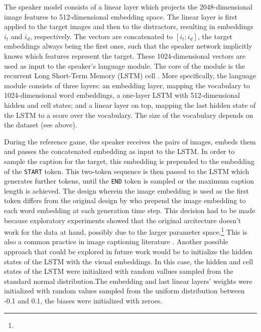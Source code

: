The speaker model consists of a linear layer which projects the 2048-dimensional image features to 512-dimensional embedding space.  The linear layer is first applied to the target images and then to the distractors, resulting in embeddings $i_t$ and $i_d$, respectively. The vectors are concatenated to $[i_t; i_d]$, the target embeddings always being the first ones, such that the speaker network implicitly knows which features represent the target. These 1024-dimensional vectors are used as input to the speaker's language module. The core of the module is the recurrent Long Short-Term Memory (LSTM) cell \parencite{hochreiter1997long}. More specifically, the language module consists of three layers: an embedding layer, mapping the vocabulary to 1024-dimensional word embeddings, a one-layer LSTM with 512-dimensional hidden and cell states; and a linear layer on top, mapping the last hidden state of the LSTM to a score over the vocabulary. The size of the vocabulary depends on the dataset (see above).

During the reference game, the speaker receives the pairs of images, embeds them and passes the concatenated embedding as input to the LSTM. In order to sample the caption for the target, this embedding is prepended to the embedding of  the \texttt{START} token. This two-token sequence is then passed to the LSTM which generates further tokens, until the \texttt{END} token is sampled or the maximum caption length is achieved. The design wherein the image embedding is used as the first token differs from the original design by \textcite{lazaridou2020multi} who prepend the image embedding to each word embedding at each generation time step. This decision had to be made because exploratory experiments showed that the original arcitecture doesn't work for the data at hand, possibly due to the larger parameter space.\footnote{} This is also a common practice in image captioning literature . Another possible approach that could be explored in future work would be to initialize the hidden states of the LSTM with the visual embeddings. In this case, the hidden and cell states of the LSTM were initialized with random vallues sampled from the standard normal distribution.The embedding and last linear layers' weights were initialized with random values sampled from the uniform distribution between -0.1 and 0.1, the biases were initialized with zeroes.  

